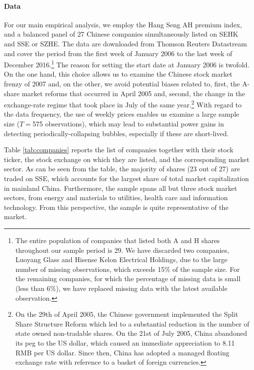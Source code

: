 \documentclass[11pt]{article}
\begin{document}
\paragraph{Data} For our main empirical analysis, we employ  the Hang Seng AH premium index, and a balanced panel of 27 Chinese companies simultaneously listed on SEHK and SSE or SZHE. The data are downloaded from Thomson Reuters Datastream and cover the period from the first week of January 2006 to the last week of December 2016.\footnote{The entire population of companies that listed both A and H shares throughout our sample period is 29. We have discarded two companies, Luoyang Glass and Hisense Kelon Electrical Holdings, due to the large number of missing observations, which exceeds 15\% of the sample size. For the remaining companies, for which the percentage of missing data is small (less than 6\%), we have replaced missing data with the latest available observation.} The reason for setting the start date at January 2006 is twofold. On the one hand, this choice allows us to examine the Chinese stock market frenzy of 2007 and, on the other, we avoid potential biases related to, first, the A-share market reforms that occurred in April 2005 and, second, the change in the exchange-rate regime that took place in July of the same year.\footnote{On the 29th of April 2005, the Chinese government implemented the Split Share Structure Reform which led to a substantial reduction in the number of state owned non-tradable shares. On the 21st of July 2005, China abandoned its peg to the US dollar, which caused an immediate appreciation to 8.11 RMB per US dollar. Since then, China has adopted a managed floating exchange rate with reference to a basket of foreign currencies.} With regard to the data frequency, the use of weekly prices enables us examine a large sample size ($T=$575 observations), which may lead to substantial power gains in detecting periodically-collapsing bubbles, especially if these are short-lived. 

Table \ref{tab:companies} reports the list of companies together with their stock ticker, the stock exchange on which they are listed, and the corresponding market sector. As can be seen from the table, the majority of shares (23 out of 27) are traded on SSE, which accounts for the largest share of total market capitalization in mainland China. Furthermore, the sample spans all but three stock market sectors, from energy and materials to utilities, health care and information technology. From this perspective, the sample is quite representative of the market. 
\end{document}
